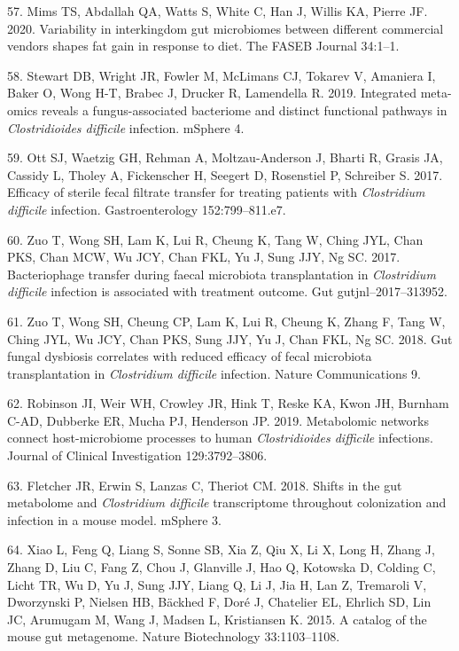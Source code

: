 \documentclass[
  11pt,
]{article}
\begin{document}
\leavevmode\hypertarget{ref-Mims2020}{}%
57. Mims TS, Abdallah QA, Watts S, White C, Han J, Willis KA, Pierre JF.
2020. Variability in interkingdom gut microbiomes between different
commercial vendors shapes fat gain in response to diet. The FASEB
Journal 34:1--1.

\leavevmode\hypertarget{ref-Stewart2019}{}%
58. Stewart DB, Wright JR, Fowler M, McLimans CJ, Tokarev V, Amaniera I,
Baker O, Wong H-T, Brabec J, Drucker R, Lamendella R. 2019. Integrated
meta-omics reveals a fungus-associated bacteriome and distinct
functional pathways in \emph{Clostridioides difficile} infection.
mSphere 4.

\leavevmode\hypertarget{ref-Ott2017}{}%
59. Ott SJ, Waetzig GH, Rehman A, Moltzau-Anderson J, Bharti R, Grasis
JA, Cassidy L, Tholey A, Fickenscher H, Seegert D, Rosenstiel P,
Schreiber S. 2017. Efficacy of sterile fecal filtrate transfer for
treating patients with \emph{Clostridium difficile} infection.
Gastroenterology 152:799--811.e7.

\leavevmode\hypertarget{ref-Zuo2017}{}%
60. Zuo T, Wong SH, Lam K, Lui R, Cheung K, Tang W, Ching JYL, Chan PKS,
Chan MCW, Wu JCY, Chan FKL, Yu J, Sung JJY, Ng SC. 2017. Bacteriophage
transfer during faecal microbiota transplantation in \emph{Clostridium
difficile} infection is associated with treatment outcome. Gut
gutjnl--2017--313952.

\leavevmode\hypertarget{ref-Zuo2018}{}%
61. Zuo T, Wong SH, Cheung CP, Lam K, Lui R, Cheung K, Zhang F, Tang W,
Ching JYL, Wu JCY, Chan PKS, Sung JJY, Yu J, Chan FKL, Ng SC. 2018. Gut
fungal dysbiosis correlates with reduced efficacy of fecal microbiota
transplantation in \emph{Clostridium difficile} infection. Nature
Communications 9.

\leavevmode\hypertarget{ref-Robinson2019}{}%
62. Robinson JI, Weir WH, Crowley JR, Hink T, Reske KA, Kwon JH, Burnham
C-AD, Dubberke ER, Mucha PJ, Henderson JP. 2019. Metabolomic networks
connect host-microbiome processes to human \emph{Clostridioides
difficile} infections. Journal of Clinical Investigation 129:3792--3806.

\leavevmode\hypertarget{ref-Fletcher2018}{}%
63. Fletcher JR, Erwin S, Lanzas C, Theriot CM. 2018. Shifts in the gut
metabolome and \emph{Clostridium difficile} transcriptome throughout
colonization and infection in a mouse model. mSphere 3.

\leavevmode\hypertarget{ref-Xiao2015}{}%
64. Xiao L, Feng Q, Liang S, Sonne SB, Xia Z, Qiu X, Li X, Long H, Zhang
J, Zhang D, Liu C, Fang Z, Chou J, Glanville J, Hao Q, Kotowska D,
Colding C, Licht TR, Wu D, Yu J, Sung JJY, Liang Q, Li J, Jia H, Lan Z,
Tremaroli V, Dworzynski P, Nielsen HB, Bäckhed F, Doré J, Chatelier EL,
Ehrlich SD, Lin JC, Arumugam M, Wang J, Madsen L, Kristiansen K. 2015. A
catalog of the mouse gut metagenome. Nature Biotechnology 33:1103--1108.
\end{document}
